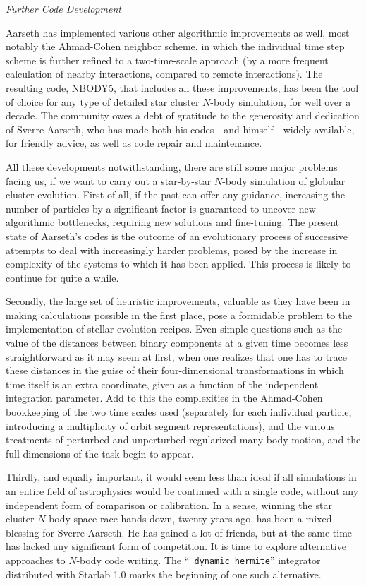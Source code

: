 \bigskip
\noindent
{\it Further Code Development}
\medskip

Aarseth has implemented various other algorithmic improvements as
well, most notably the Ahmad-Cohen neighbor scheme, in which the
individual time step scheme is further refined to a two-time-scale
approach (by a more frequent calculation of nearby interactions,
compared to remote interactions).  The resulting code, NBODY5, that
includes all these improvements, has been the tool of choice for any
type of detailed star cluster $N$-body simulation, for well over a
decade.  The community owes a debt of gratitude to the generosity and
dedication of Sverre Aarseth, who has made both his codes---and
himself---widely available, for friendly advice, as well as code
repair and maintenance.

All these developments notwithstanding, there are still some major
problems facing us, if we want to carry out a star-by-star $N$-body
simulation of globular cluster evolution.  First of all, if the past
can offer any guidance, increasing the number of particles by a
significant factor is guaranteed to uncover new algorithmic
bottlenecks, requiring new solutions and fine-tuning.  The present
state of Aarseth's codes is the outcome of an evolutionary process of
successive attempts to deal with increasingly harder problems, posed
by the increase in complexity of the systems to which it has been
applied.  This process is likely to continue for quite a while.

Secondly, the large set of heuristic improvements, valuable as they
have been in making calculations possible in the first place, pose a
formidable problem to the implementation of stellar evolution recipes.
Even simple questions such as the value of the distances between
binary components at a given time becomes less straightforward as it
may seem at first, when one realizes that one has to trace these
distances in the guise of their four-dimensional transformations in
which time itself is an extra coordinate, given as a function of the
independent integration parameter.  Add to this the complexities in
the Ahmad-Cohen bookkeeping of the two time scales used (separately
for each individual particle, introducing a multiplicity of orbit
segment representations), and the various treatments of perturbed and
unperturbed regularized many-body motion, and the full dimensions of
the task begin to appear.

Thirdly, and equally important, it would seem less than ideal if all
simulations in an entire field of astrophysics would be continued with
a single code, without any independent form of comparison or
calibration.  In a sense, winning the star cluster $N$-body space race
hands-down, twenty years ago, has been a mixed blessing for Sverre
Aarseth.  He has gained a lot of friends, but at the same time has
lacked any significant form of competition.  It is time to explore
alternative approaches to $N$-body code writing.  The ``{\tt
dynamic\_hermite}'' integrator distributed with Starlab 1.0 marks the
beginning of one such alternative.

